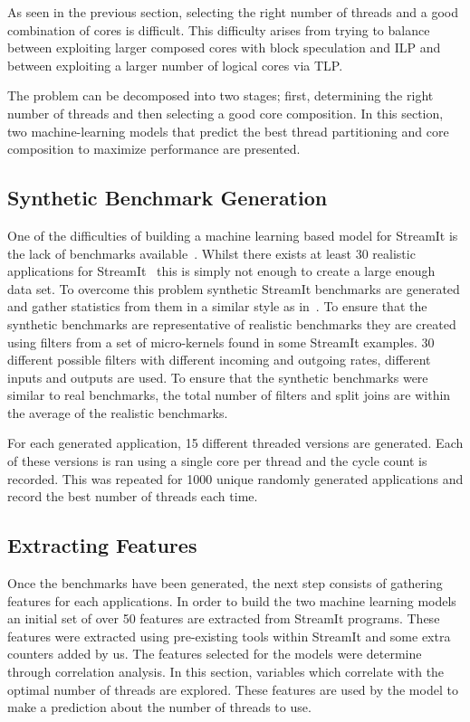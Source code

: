 As seen in the previous section, selecting the right number of threads and a good combination of cores is difficult.
This difficulty arises from trying to balance between exploiting larger composed cores with block speculation and ILP and between exploiting a larger number of logical cores via TLP.

The problem can be decomposed into two stages; first, determining the right number of threads and then selecting a good core composition.
In this section, two machine-learning models that predict the best thread partitioning and core composition to maximize performance are presented.

\subsection{Synthetic Benchmark Generation}

One of the difficulties of building a machine learning based model for StreamIt is the lack of benchmarks available~\cite{wang2013partitionstreamit}.
Whilst there exists at least 30 realistic applications for StreamIt~\cite{theis2010empericalcharstreamit} this is simply not enough to create a large enough data set.
To overcome this problem synthetic StreamIt benchmarks are generated and gather statistics from them in a similar style as in~\cite{wang2013partitionstreamit}.
To ensure that the synthetic benchmarks are representative of realistic benchmarks they are created using filters from a set of micro-kernels found in some StreamIt examples.
30 different possible filters with different incoming and outgoing rates, different inputs and outputs are used.
To ensure that the synthetic benchmarks were similar to real benchmarks, the total number of filters and split joins are within the average of the realistic benchmarks.

For each generated application, 15 different threaded versions are generated.
Each of these versions is ran using a single core per thread and the cycle count is recorded.
This was repeated for 1000 unique randomly generated applications and record the best number of threads each time.

\subsection{Extracting Features}

Once the benchmarks have been generated, the next step consists of gathering features for each applications.
In order to build the two machine learning models an initial set of over 50 features are extracted from StreamIt programs.
These features were extracted using pre-existing tools within StreamIt and some extra counters added by us.
The features selected for the models were determine through correlation analysis.
In this section, variables which correlate with the optimal number of threads are explored.
These features are used by the model to make a prediction about the number of threads to use.

